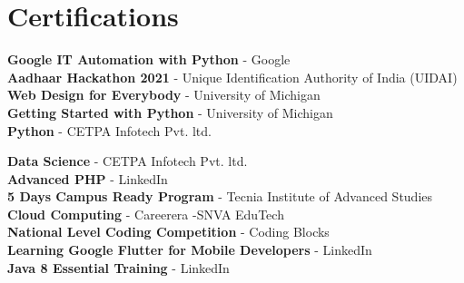 \documentclass[]{deedy-resume-openfont}
\begin{document}
\section{Certifications}
\begin{minipage}[t]{0.4\textwidth} 

\textbf{Google IT Automation with Python} - Google\\
\textbf{Aadhaar Hackathon 2021} - Unique Identification Authority of India (UIDAI)\\
\textbf{Web Design for Everybody} - University of Michigan\\
\textbf{Getting Started with Python} - University of Michigan\\
\textbf{Python} - CETPA Infotech Pvt. ltd.\\
\end{minipage} 
\hfill
\begin{minipage}[t]{0.55\textwidth} 
\textbf{Data Science} - CETPA Infotech Pvt. ltd.\\
\textbf{Advanced PHP} - LinkedIn\\
\textbf{5 Days Campus Ready Program} - Tecnia Institute of Advanced Studies
\textbf{Cloud Computing} - Careerera -SNVA EduTech\\
\textbf{National Level Coding Competition} - Coding Blocks\\
\textbf{Learning Google Flutter for Mobile Developers} - LinkedIn\\
\textbf{Java 8 Essential Training} - LinkedIn\\
\end{minipage} 
\end{document}

